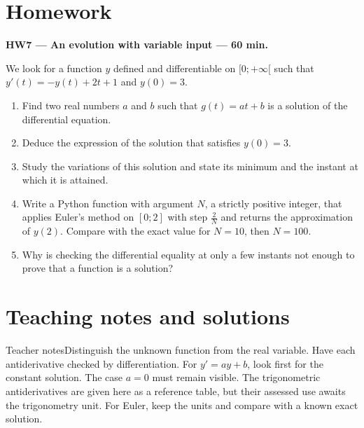 \section{Homework}\textbf{HW7 --- An evolution with variable input --- 60 min.}\par We look for a function $y$ defined and differentiable on $[0;+\infty[$ such that $y' (t)=-y(t)+2t+1$ and $y(0)=3$.
\begin{enumerate}\item Find two real numbers $a$ and $b$ such that $g(t)=at+b$ is a solution of the differential equation.
\item Deduce the expression of the solution that satisfies $y(0)=3$.
\item Study the variations of this solution and state its minimum and the instant at which it is attained.
\item Write a Python function with argument $N$, a strictly positive integer, that applies Euler's method on $[0;2]$ with step $\frac2N$ and returns the approximation of $y(2)$. Compare with the exact value for $N=10$, then $N=100$.
\item Why is checking the differential equality at only a few instants not enough to prove that a function is a solution?\end{enumerate}

\ifprof\clearpage\section{Teaching notes and solutions}\begin{profbox}{Teacher notes}Distinguish the unknown function from the real variable. Have each antiderivative checked by differentiation. For $y'=ay+b$, look first for the constant solution. The case $a=0$ must remain visible. The trigonometric antiderivatives are given here as a reference table, but their assessed use awaits the trigonometry unit. For Euler, keep the units and compare with a known exact solution.\end{profbox}

